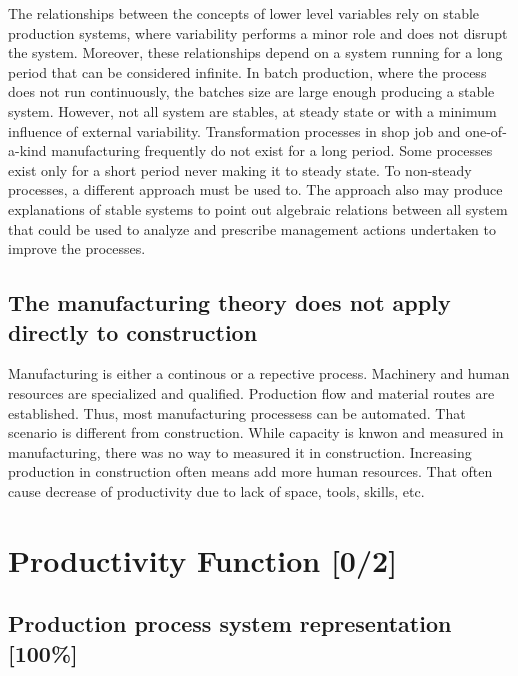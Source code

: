 \documentclass{article}
\begin{document}
The relationships between the concepts of lower level variables rely on stable production systems, where variability performs a minor role and does not disrupt the system.
Moreover, these relationships depend on a system running for a long period that can be considered infinite.
In batch production, where the process does not run continuously, the batches size are large enough producing a stable system.
However, not all system are stables, at steady state or with a minimum influence of external variability.
Transformation processes in shop job and one-of-a-kind manufacturing frequently do not exist for a long period.
Some processes exist only for a short period never making it to steady state.
To non-steady processes, a different approach must be used to.
The approach also may produce explanations of stable systems to point out algebraic relations between all system that could be used to analyze and prescribe management actions undertaken to improve the processes.

\subsection{The manufacturing theory does not apply directly to construction}
\label{sec:org103880d}

Manufacturing is either a continous or a repective process.
Machinery and human resources are specialized and qualified.
Production flow and material routes are established. 
Thus, most manufacturing processess can be automated.
That scenario is different from construction.
While capacity is knwon and measured in manufacturing, there was no way to measured it in construction.
Increasing production in construction often means add more human resources.
That often cause decrease of productivity due to lack of space, tools, skills, etc.

\section{Productivity Function [0/2]}
\label{sec:org640192f}
\subsection{Production process system representation [100\%]}
\label{sec:org0f559ec}
\end{document}
